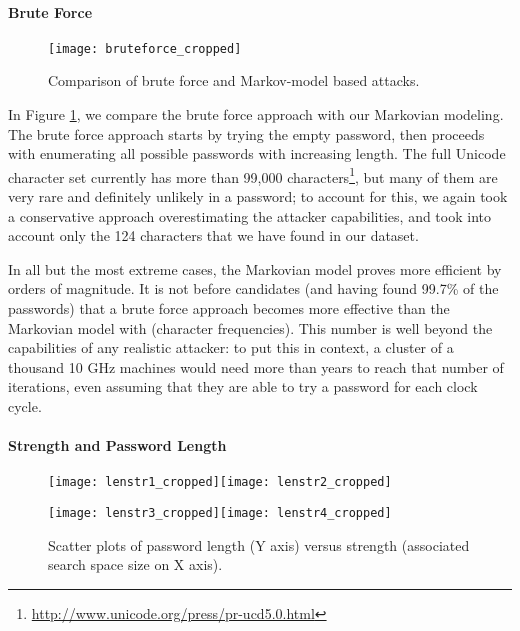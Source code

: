 \documentclass[a4paper,twocolumn]{article}
\begin{document}
\paragraph{Brute Force}

\begin{figure}
\begin{centering}
\texttt{[image: bruteforce\_cropped]}
\par\end{centering}

\caption{\label{fig:Brute-force.}Comparison of brute force and Markov-model
based attacks.}

\end{figure}


In Figure \ref{fig:Brute-force.}, we compare the brute force approach
with our Markovian modeling. The brute force approach starts by trying
the empty password, then proceeds with enumerating all possible passwords
with increasing length. The full Unicode character set currently has
more than 99,000 characters\footnote{\url{http://www.unicode.org/press/pr-ucd5.0.html}}, but many of them are very rare and definitely unlikely in a password;
to account for this, we again took a conservative approach overestimating
the attacker capabilities, and took into account only the 124 characters
that we have found in our dataset.

In all but the most extreme cases, the Markovian model proves more
efficient by orders of magnitude. It is not before  candidates
(and having found 99.7\% of the passwords) that a brute force approach
becomes more effective than the Markovian model with  (character
frequencies). This number is well beyond the capabilities of any realistic
attacker: to put this in context, a cluster of a thousand 10 GHz machines
would need more than  years to reach that number of
iterations, even assuming that they are able to try a password for
each clock cycle.


\paragraph{Strength and Password Length}

\begin{figure}
\begin{centering}
\texttt{[image: lenstr1\_cropped]}\texttt{[image: lenstr2\_cropped]}
\par\end{centering}

\begin{centering}
\texttt{[image: lenstr3\_cropped]}\texttt{[image: lenstr4\_cropped]}
\par\end{centering}

\caption{\label{fig:Password-length-vs.}Scatter plots of password length (Y
axis) versus strength (associated search space size on X axis).}

\end{figure}
\end{document}
